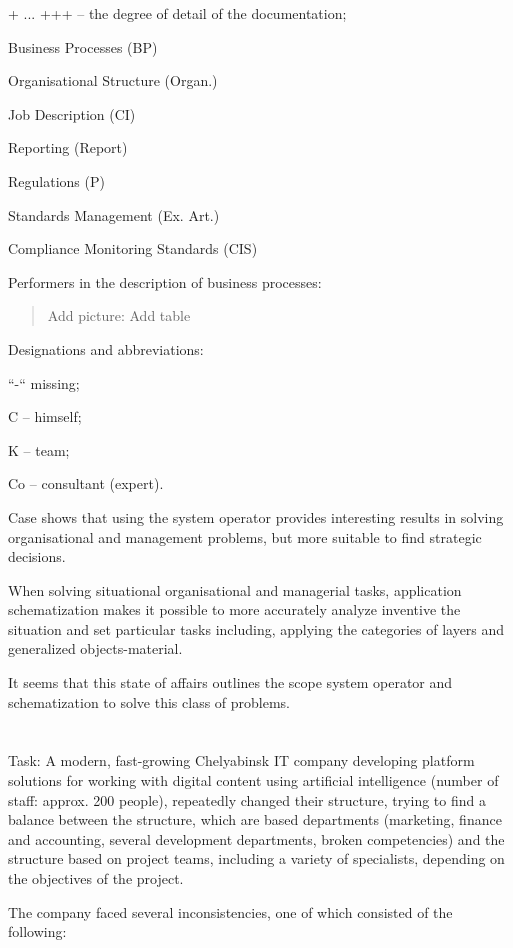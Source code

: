 \documentclass[11pt,a4paper]{book}
\newcommand{\addpicture}[1]{
  \begin{quote} Add picture: #1\end{quote}
}
\begin{document}
+ ... +++ -- the degree of detail of the documentation;

Business Processes (BP)

Organisational Structure (Organ.)

Job Description (CI)

Reporting (Report)

Regulations (P)

Standards Management (Ex. Art.)

Compliance Monitoring Standards (CIS)

Performers in the description of business processes:

\addpicture{Add table}

Designations and abbreviations:

“-“ missing;

C -- himself;

K -- team;

Co -- consultant (expert).

Case shows that using the system operator provides interesting results in
solving organisational and management problems, but more suitable to find
strategic decisions.

When solving situational organisational and managerial tasks, application
schematization makes it possible to more accurately analyze inventive the
situation and set particular tasks including, applying the categories of
layers and generalized objects-material.

It seems that this state of affairs outlines the scope system operator and
schematization to solve this class of problems.

\chapter{}%

Task: A modern, fast-growing Chelyabinsk IT company developing platform
solutions for working with digital content using artificial intelligence
(number of staff: approx. 200 people), repeatedly changed their structure,
trying to find a balance between the structure, which are based departments
(marketing, finance and accounting, several development departments, broken
competencies) and the structure based on project teams, including a variety of
specialists, depending on the objectives of the project.

The company faced several inconsistencies, one of which consisted of the
following:
\end{document}

